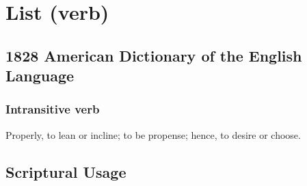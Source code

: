 \section{List (verb)}
	\label{LIST}
	

\subsection{1828 American Dictionary of the English Language} %
	\label{LIST-1828}
	
	\subsubsection{Intransitive verb}

		\begin{compactitem}
			\item Properly, to lean or incline; to be propense; hence, to desire or choose.
		\end{compactitem}



\subsection{Scriptural Usage} %
	\label{LIST-SCRIPTURES}

	
